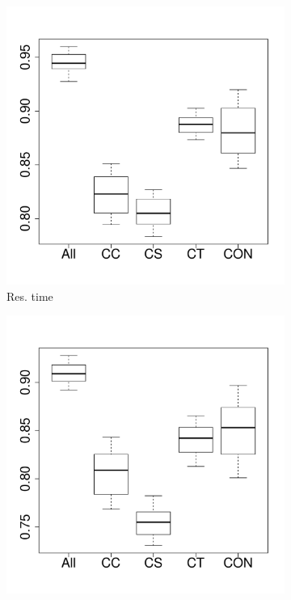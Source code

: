 \begin{figure}[t]
	\centering
        \begin{subfigure}{0.19\textwidth}
                \includegraphics[width=\linewidth]{Figures/runtime-hadoopkeep-importance.pdf}
                \caption{Res. time}
        \end{subfigure}%
        \begin{subfigure}{0.19\textwidth}
                \includegraphics[width=\linewidth]{Figures/cpu-hadoopkeep-importance.pdf}

\end{subfigure}
\end{figure}
